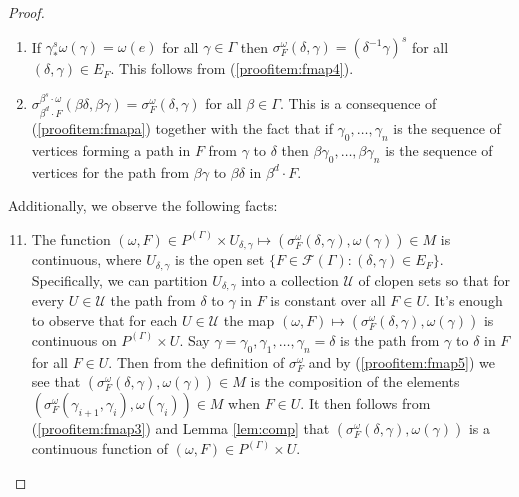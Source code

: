 \documentclass[12pt]{amsart}
\theoremstyle{definition}
\def\cal{\mathcal}
\begin{document}
\begin{proof}
\begin{enumerate}
\begin{align*}
			\sigma_F^\omega(\delta, \gamma) & = \sigma_F^\omega(\delta, \beta') \circ \sigma_F^\omega(\beta', \gamma).
		\end{align*}
		The right-sides of these two equations are $\omega(\gamma)$-almost-everywhere equal since $\sigma_F^\omega(\beta', \gamma)$ pushes $\omega(\gamma)$ forward to $\omega(\beta')$ by (\ref{proofitem:fmap5}) and $\sigma_F^\omega(\beta', \beta) \circ \sigma_F^\omega(\beta, \beta')$ is $\omega(\beta')$-almost-everywhere equal to the identity by (\ref{proofitem:fmap7}). This establishes the claim.
		\item \label{proofitem:fmap10} If $\gamma^s_* \omega(\gamma) = \omega(e)$ for all $\gamma \in \Gamma$ then $\sigma_F^\omega(\delta, \gamma) = (\delta^{-1} \gamma)^s$ for all $(\delta, \gamma) \in E_F$. This follows from (\ref{proofitem:fmap4}).
		\item \label{proofitem:fmapb} $\sigma_{\beta^d \cdot F}^{\beta^s \cdot \omega}(\beta \delta, \beta \gamma) = \sigma_F^\omega(\delta, \gamma)$ for all $\beta \in \Gamma$. This is a consequence of (\ref{proofitem:fmapa}) together with the fact that if $\gamma_0, \ldots, \gamma_n$ is the sequence of vertices forming a path in $F$ from $\gamma$ to $\delta$ then $\beta \gamma_0, \ldots, \beta \gamma_n$ is the sequence of vertices for the path from $\beta \gamma$ to $\beta \delta$ in $\beta^d \cdot F$.
	\end{enumerate}
	Additionally, we observe the following facts:
	\begin{enumerate}\setcounter{enumi}{10}
		\item \label{proofitem:fmapc} The function $(\omega, F) \in P^{(\Gamma)} \times U_{\delta, \gamma} \mapsto (\sigma^\omega_F(\delta, \gamma), \omega(\gamma)) \in M$ is continuous, where $U_{\delta, \gamma}$ is the open set $\{F \in \cal F(\Gamma) : (\delta, \gamma) \in E_F\}$. Specifically, we can partition $U_{\delta, \gamma}$ into a collection $\cal U$ of clopen sets so that for every $U \in \cal U$ the path from $\delta$ to $\gamma$ in $F$ is constant over all $F \in U$. It's enough to observe that for each $U \in \cal U$ the map $(\omega, F) \mapsto (\sigma^\omega_F(\delta, \gamma), \omega(\gamma))$ is continuous on $P^{(\Gamma)} \times U$. Say $\gamma = \gamma_0, \gamma_1, \ldots, \gamma_n = \delta$ is the path from $\gamma$ to $\delta$ in $F$ for all $F \in U$. Then from the definition of $\sigma^\omega_F$ and by (\ref{proofitem:fmap5}) we see that $(\sigma^\omega_F(\delta, \gamma), \omega(\gamma)) \in M$ is the composition of the elements $(\sigma^\omega_F(\gamma_{i+1}, \gamma_i), \omega(\gamma_i)) \in M$ when $F \in U$. It then follows from (\ref{proofitem:fmap3}) and Lemma \ref{lem:comp} that $(\sigma^\omega_F(\delta, \gamma), \omega(\gamma))$ is a continuous function of $(\omega, F) \in P^{(\Gamma)} \times U$.

\end{enumerate}
\end{proof}
\end{document}
